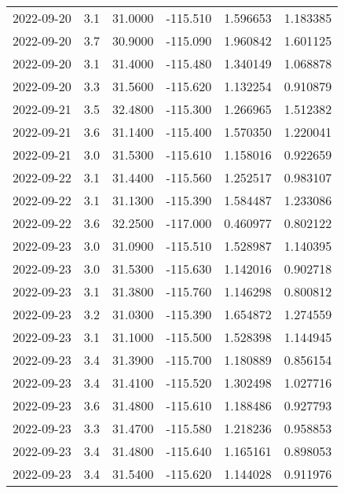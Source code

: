 \begin{tabular}{lrrrrr}
2022-09-20 &       3.1 &  31.0000 &  -115.510 &         1.596653 &         1.183385 \\
2022-09-20 &       3.7 &  30.9000 &  -115.090 &         1.960842 &         1.601125 \\
2022-09-20 &       3.1 &  31.4000 &  -115.480 &         1.340149 &         1.068878 \\
2022-09-20 &       3.3 &  31.5600 &  -115.620 &         1.132254 &         0.910879 \\
2022-09-21 &       3.5 &  32.4800 &  -115.300 &         1.266965 &         1.512382 \\
2022-09-21 &       3.6 &  31.1400 &  -115.400 &         1.570350 &         1.220041 \\
2022-09-21 &       3.0 &  31.5300 &  -115.610 &         1.158016 &         0.922659 \\
2022-09-22 &       3.1 &  31.4400 &  -115.560 &         1.252517 &         0.983107 \\
2022-09-22 &       3.1 &  31.1300 &  -115.390 &         1.584487 &         1.233086 \\
2022-09-22 &       3.6 &  32.2500 &  -117.000 &         0.460977 &         0.802122 \\
2022-09-23 &       3.0 &  31.0900 &  -115.510 &         1.528987 &         1.140395 \\
2022-09-23 &       3.0 &  31.5300 &  -115.630 &         1.142016 &         0.902718 \\
2022-09-23 &       3.1 &  31.3800 &  -115.760 &         1.146298 &         0.800812 \\
2022-09-23 &       3.2 &  31.0300 &  -115.390 &         1.654872 &         1.274559 \\
2022-09-23 &       3.1 &  31.1000 &  -115.500 &         1.528398 &         1.144945 \\
2022-09-23 &       3.4 &  31.3900 &  -115.700 &         1.180889 &         0.856154 \\
2022-09-23 &       3.4 &  31.4100 &  -115.520 &         1.302498 &         1.027716 \\
2022-09-23 &       3.6 &  31.4800 &  -115.610 &         1.188486 &         0.927793 \\
2022-09-23 &       3.3 &  31.4700 &  -115.580 &         1.218236 &         0.958853 \\
2022-09-23 &       3.4 &  31.4800 &  -115.640 &         1.165161 &         0.898053 \\
2022-09-23 &       3.4 &  31.5400 &  -115.620 &         1.144028 &         0.911976 \\

\end{tabular}
